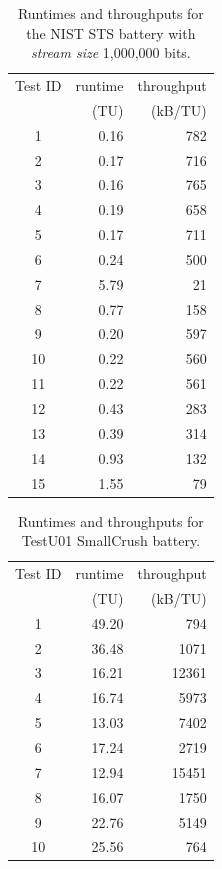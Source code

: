 \documentclass[
  digital,     %
  oneside,     %
  nosansbold,  %
  nocolorbold, %
  nolof,         %
  nolot,         %
]{fithesis4}
\begin{document}
\begin{table}[H]
  \begin{tabularx}{0.5\textwidth}{c|r|r}
    Test ID & runtime & throughput\\
     & (TU) & (kB/TU) \\
    \midrule
    1 & 0.16 & 782 \\
    2 & 0.17 & 716 \\
    3 & 0.16 & 765 \\
    4 & 0.19 & 658 \\
    5 & 0.17 & 711 \\
    6 & 0.24 & 500 \\
    7 & 5.79 & 21 \\
    8 & 0.77 & 158 \\
    9 & 0.20 & 597 \\
    10 & 0.22 & 560 \\
    11 & 0.22 & 561 \\
    12 & 0.43 & 283 \\
    13 & 0.39 & 314 \\
    14 & 0.93 & 132 \\
15 & 1.55 & 79 \\
  \end{tabularx}
  \caption{Runtimes and throughputs for the NIST STS battery with \emph{stream size} 1,000,000 bits.}
  \label{tab:analysis_nist_time}
\end{table}


\begin{table}[H]
  \begin{tabularx}{0.5\textwidth}{c|r|r}
    Test ID & runtime & throughput\\
     & (TU) & (kB/TU) \\
    \midrule
    1 & 49.20 & 794 \\
    2 & 36.48 & 1071 \\
    3 & 16.21 & 12361 \\
    4 & 16.74 & 5973 \\
    5 & 13.03 & 7402 \\
    6 & 17.24 & 2719 \\
    7 & 12.94 & 15451 \\
    8 & 16.07 & 1750 \\
    9 & 22.76 & 5149 \\
    10 & 25.56 & 764 \\
  \end{tabularx}
  \caption{Runtimes and throughputs for TestU01 SmallCrush battery.}
  \label{tab:analysis_smallcrush_time}
\end{table}
\end{document}

